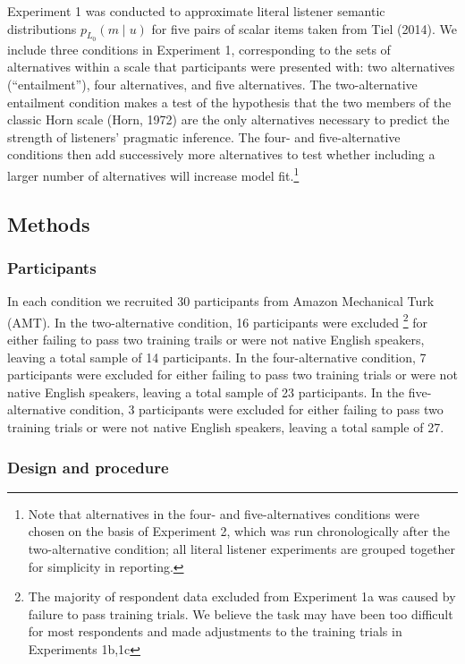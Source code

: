 \documentclass[10pt, letterpaper]{article}
\begin{document}
Experiment 1 was conducted to approximate literal listener semantic
distributions \(p_{L_0}(m \mid u)\) for five pairs of scalar items taken
from Tiel (2014). We include three conditions in Experiment 1,
corresponding to the sets of alternatives within a scale that
participants were presented with: two alternatives (``entailment''),
four alternatives, and five alternatives. The two-alternative entailment
condition makes a test of the hypothesis that the two members of the
classic Horn scale (Horn, 1972) are the only alternatives necessary to
predict the strength of listeners' pragmatic inference. The four- and
five-alternative conditions then add successively more alternatives to
test whether including a larger number of alternatives will increase
model
fit.\footnote{Note that alternatives in the four- and five-alternatives conditions were chosen on the basis of Experiment 2, which was run chronologically after the two-alternative condition; all literal listener experiments are grouped together for simplicity in reporting.}

\subsection{Methods}\label{methods}

\subsubsection{Participants}\label{participants}

In each condition we recruited 30 participants from Amazon Mechanical
Turk (AMT). In the two-alternative condition, 16 participants were
excluded
\footnote{The majority of respondent data excluded from Experiment 1a was caused by failure to pass training trials. We believe the task may have been too difficult for most respondents and made adjustments to the training trials in Experiments 1b,1c}
for either failing to pass two training trails or were not native
English speakers, leaving a total sample of 14 participants. In the
four-alternative condition, 7 participants were excluded for either
failing to pass two training trials or were not native English speakers,
leaving a total sample of 23 participants. In the five-alternative
condition, 3 participants were excluded for either failing to pass two
training trials or were not native English speakers, leaving a total
sample of 27.

\subsubsection{Design and procedure}\label{design-and-procedure}
\end{document}
